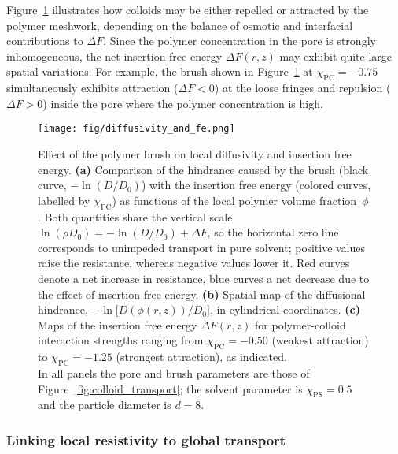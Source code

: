 \documentclass[12pt, a4paper]{article}
\begin{document}
Figure~\ref{fig:DeltaF_map} illustrates how colloids may be either repelled or attracted by the polymer meshwork, depending on the balance of osmotic and interfacial contributions to $\Delta F$.
Since the polymer concentration in the pore is strongly inhomogeneous, the net insertion free energy $\Delta F(r,z)$ may exhibit quite large spatial variations.
For example, the brush shown in Figure~\ref{fig:DeltaF_map} at $\chi_{\text{PC}}=-0.75$ simultaneously exhibits attraction ($\Delta F<0$) at the loose fringes and repulsion ($\Delta F>0$) inside the pore where the polymer concentration is high.

\begin{figure}
    \centering
    \centerline{\texttt{[image: fig/diffusivity\_and\_fe.png]}}
    \caption{%
        Effect of the polymer brush on local diffusivity and insertion free energy.  
        \textbf{(a)}  Comparison of the hindrance caused by the brush (black curve, $-\ln(D/D_{0})$) with the insertion free energy (colored curves, labelled by $\chi_{\text{PC}}$) as functions of the local polymer volume fraction~$\phi$.  
        Both quantities share the vertical scale  
        $\ln(\rho D_{0}) = -\ln(D/D_{0}) + \Delta F$,  
        so the horizontal zero line corresponds to unimpeded transport in pure solvent; positive values raise the resistance, whereas negative values lower it.
        Red curves denote a net increase in resistance, blue curves a net decrease due to the effect of insertion free energy.  
        \textbf{(b)}  Spatial map of the diffusional hindrance, $-\ln\bigl[D(\phi(r,z))/D_{0}\bigr]$, in cylindrical coordinates.  
        \textbf{(c)}  Maps of the insertion free energy $\Delta F(r,z)$ for polymer-colloid interaction strengths ranging from $\chi_{\text{PC}}=-0.50$ (weakest attraction) to $\chi_{\text{PC}}=-1.25$ (strongest attraction), as indicated.
        \\  
        In all panels the pore and brush parameters are those of Figure~\ref{fig:colloid_transport}; the solvent parameter is $\chi_{\text{PS}}=0.5$ and the particle diameter is $d=8$.%
    }
    \label{fig:DeltaF_map}
\end{figure}



\subsubsection{Linking local resistivity to global transport}
\end{document}
